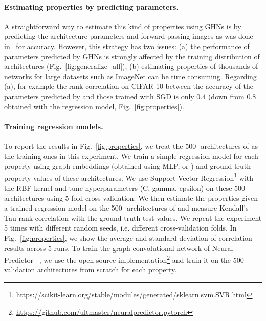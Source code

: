 \paragraph{Estimating properties by predicting parameters.}  A straightforward way to estimate this kind of properties using GHNs is by predicting the architecture parameters and forward passing images as was done in~\cite{zhang2018graph} for accuracy. 
However, this strategy has two issues: (a) the performance of parameters predicted by GHNs is strongly affected by the training distribution of architectures (Fig.~\ref{fig:generalize_all});
(b) estimating properties of thousands of networks for large datasets such as ImageNet can be time consuming.
Regarding (a), for example the rank correlation on CIFAR-10 between the accuracy of the parameters predicted by \ghnours and those trained with SGD is only 0.4 (down from 0.8 obtained with the regression model, Fig.~\ref{fig:properties}). 

\paragraph{Training regression models.} To report the results in Fig.~\ref{fig:properties}, we treat the 500 \iid-\iidval architectures of \dataset as the training ones in this experiment. We train a simple regression model for each property using graph embeddings (obtained using MLP, \ghnbase or \ghnours) and ground truth property values of these architectures. We use Support Vector Regression\footnote{https://scikit-learn.org/stable/modules/generated/sklearn.svm.SVR.html} with the RBF kernel and tune hyperparameters (C, gamma, epsilon) on these 500 architectures using 5-fold cross-validation. We then estimate the properties given a trained regression model on the 500 \iid-\iidtest architectures of \dataset and measure Kendall's Tau rank correlation with the ground truth test values. We repeat the experiment 5 times with different random seeds, i.e. different cross-validation folds. In Fig.~\ref{fig:properties}, we show the average and standard deviation of correlation results across 5 runs.
To train the graph convolutional network of Neural Predictor ~\cite{wen2020neural}, we use the open source implementation\footnote{\url{https://github.com/ultmaster/neuralpredictor.pytorch}} and train it on the 500 validation architectures from scratch for each property.


